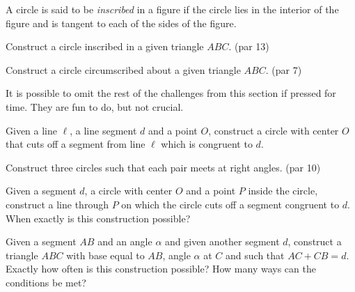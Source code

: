 \begin{definition}A circle is said to be \emph{inscribed} in a figure if the circle lies in the interior of the figure and is tangent to each of the sides of the figure.
\end{definition}

\begin{challenge}\label{chal:triangle-inscribe-circle}
Construct a circle inscribed in a given triangle $ABC$. (par 13)
\end{challenge}

\begin{challenge}\label{chal:triangle-circumscribe-circle}
Construct a circle circumscribed about a given triangle $ABC$. (par 7)
\end{challenge}

\begin{annotation}
{
\color{blue}
It is possible to omit the rest of the challenges from this section if pressed for time. They are fun to do, but not crucial.
}
\end{annotation}


\begin{challenge}\label{chal:cut-segment-by-circle}
Given a line $\ell$, a line segment $d$ and a point $O$, construct a circle with center $O$ that cuts off a segment from line $\ell$ which is congruent to $d$.
\end{challenge}



\begin{challenge}\label{chal:three-perp-circles}
Construct three circles such that each pair meets at right angles. (par 10)
\end{challenge}

\begin{challenge}\label{chal:cut-circle-by-segment}
Given a segment $d$, a circle with center $O$ and a point $P$ inside the circle, construct a line through $P$ on which the circle cuts off a segment congruent to $d$.
When exactly is this construction possible?
\end{challenge}


\begin{challenge}\label{chal:triangle-problem}
Given a segment $AB$ and an angle $\alpha$ and given another segment $d$, construct a triangle $ABC$ with base equal to $AB$, angle $\alpha$ at $C$ and such that $AC + CB = d$.
Exactly how often is this construction possible? How many ways can the conditions be met?
\end{challenge}



